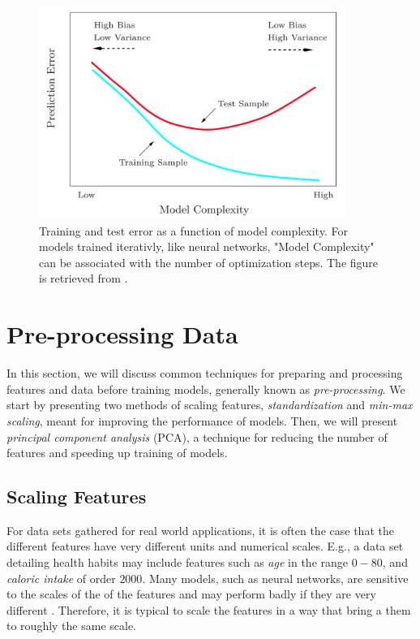 \begin{figure}[H]
    \centering
    \includegraphics[width=10cm]{latex/figures/train_test.png}
    \caption{Training and test error as a function of model complexity. For models trained iterativly, like neural networks, "Model Complexity" can be associated with the number of optimization steps. The figure is retrieved from \citet{hastie01statisticallearning}.}
    \label{fig:train_test}
\end{figure}


\section{Pre-processing Data}\label{sec:Pre-processing Features Theory}
In this section, we will discuss common techniques for preparing and processing features and data before training models, generally known as \emph{pre-processing}. We start by presenting two methods of scaling features, \emph{standardization} and \emph{min-max scaling}, meant for improving the performance of models. Then, we will present \emph{principal component analysis} (PCA), a technique for reducing the number of features and speeding up training of models. 

\subsection{Scaling Features}\label{sec:Scaling Features}
For data sets gathered for real world applications, it is often the case that the different features have very different units and numerical scales. E.g., a data set detailing health habits may include features such as \emph{age} in the range $0-80$, and \emph{caloric intake} of order $2000$. Many models, such as neural networks, are sensitive to the scales of the of the features and may perform badly if they are very different \cite{hands-on}. Therefore, it is typical to scale the features in a way that bring a them to roughly the same scale. 

